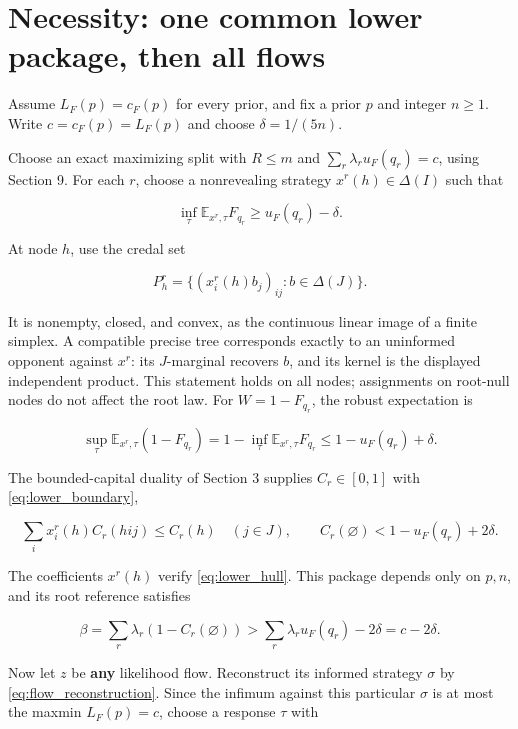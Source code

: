 \documentclass[11pt,a4paper]{article}
\begin{document}
\section{Necessity: one common lower package, then all flows}

Assume \(L_F(p)=c_F(p)\) for every prior, and fix a prior \(p\) and integer \(n\ge1\). Write \(c=c_F(p)=L_F(p)\) and choose \(\delta=1/(5n)\).

Choose an exact maximizing split with \(R\le m\) and \(\sum_r\lambda_ru_F(q_r)=c\), using Section 9. For each \(r\), choose a nonrevealing strategy \(x^r(h)\in\Delta(I)\) such that

\begin{equation}
\inf_\tau\mathbb E_{x^r,\tau}F_{q_r}\ge u_F(q_r)-\delta.
\label{eq:nonrevealing_guarantee}
\end{equation}

At node \(h\), use the credal set

\[
P^r_h=\{(x^r_i(h)b_j)_{ij}:b\in\Delta(J)\}.
\]

It is nonempty, closed, and convex, as the continuous linear image of a finite simplex. A compatible precise tree corresponds exactly to an uninformed opponent against \(x^r\): its \(J\)-marginal recovers \(b\), and its kernel is the displayed independent product. This statement holds on all nodes; assignments on root-null nodes do not affect the root law. For \(W=1-F_{q_r}\), the robust expectation is

\[
\sup_\tau\mathbb E_{x^r,\tau}(1-F_{q_r})
=1-\inf_\tau\mathbb E_{x^r,\tau}F_{q_r}
\le1-u_F(q_r)+\delta.
\]

The bounded-capital duality of Section 3 supplies \(C_r\in[0,1]\) with \eqref{eq:lower_boundary},

\[
\sum_i x^r_i(h)C_r(hij)\le C_r(h)\quad(j\in J),
\qquad C_r(\varnothing)<1-u_F(q_r)+2\delta.
\]

The coefficients \(x^r(h)\) verify \eqref{eq:lower_hull}. This package depends only on \(p,n\), and its root reference satisfies

\begin{equation}
\beta=\sum_r\lambda_r(1-C_r(\varnothing))
>\sum_r\lambda_r u_F(q_r)-2\delta=c-2\delta.
\label{eq:reference_cost}
\end{equation}

Now let \(z\) be \textbf{any} likelihood flow. Reconstruct its informed strategy \(\sigma\) by \eqref{eq:flow_reconstruction}. Since the infimum against this particular \(\sigma\) is at most the maxmin \(L_F(p)=c\), choose a response \(\tau\) with
\end{document}
